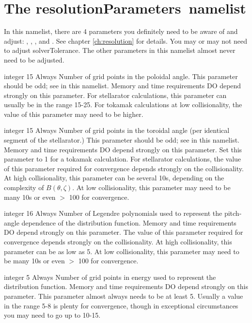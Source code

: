 \section{The {\ttfamily resolutionParameters}~namelist}
\label{sec:resolutionParameters}

In this namelist, there are 4 parameters you definitely need to be aware of and adjust: \Ntheta, \Nzeta, \Nxi, and \Nx.  
See chapter \ref{ch:resolution} for details. You may or may not
need to adjust {\ttfamily solverTolerance}.  The other parameters in this namelist almost never need to be adjusted.

\myhrule

{integer}
{15}
{Always}
{Number of grid points in the poloidal angle. 
This parameter should be odd; see  in this namelist.
Memory and time requirements DO depend strongly on this parameter.
For stellarator calculations, this parameter can usually be in the range 15-25.
For tokamak calculations at low collisionality, the value of this parameter may need to be higher.}


\myhrule

{integer}
{15}
{Always}
{Number of grid points in the toroidal angle (per identical segment of the stellarator.)  
This parameter should be odd; see  in this namelist.
Memory and time requirements DO depend strongly on this parameter.
Set this parameter to 1 for a tokamak calculation.
For stellarator calculations, the value of this parameter required for convergence depends strongly on
the collisionality. At high collisionality, this parameter can be several 10s, depending
on the complexity of $B(\theta,\zeta)$. At low collisionality, this parameter may need to be many 10s or
even $>$ 100 for convergence.
}

\myhrule

{integer}
{16}
{Always}
{Number of Legendre polynomials used to represent the pitch-angle dependence of the distribution function.
Memory and time requirements DO depend strongly on this parameter.
The value of this parameter required for convergence depends strongly on
the collisionality. At high collisionality, this parameter can be as low
as 5. At low collisionality, this parameter may need to be many 10s or
even $>$ 100 for convergence.}

\myhrule

{integer}
{5}
{Always}
{Number of grid points in energy used to represent the distribution function.
Memory and time requirements DO depend strongly on this parameter.
This parameter almost always needs to be at least 5.
Usually a value in the range 5-8 is plenty for convergence, though in exceptional circumstances
you may need to go up to 10-15.
}

